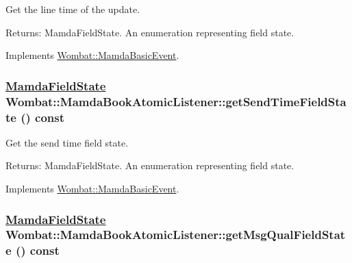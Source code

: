 Get the line time of the update. 

\begin{Desc}
\item[Returns:]Mamda\-Field\-State. An enumeration representing field state. \end{Desc}


Implements \hyperlink{classWombat_1_1MamdaBasicEvent_eb06352aca3280c5e89bad7a3b185cdf}{Wombat::Mamda\-Basic\-Event}.\hypertarget{classWombat_1_1MamdaBookAtomicListener_158632d4f501353404c44410f71555c4}{
\subsubsection[getSendTimeFieldState]{\setlength{\rightskip}{0pt plus 5cm}\hyperlink{namespaceWombat_93aac974f2ab713554fd12a1fa3b7d2a}{Mamda\-Field\-State} Wombat::Mamda\-Book\-Atomic\-Listener::get\-Send\-Time\-Field\-State () const}}
\label{classWombat_1_1MamdaBookAtomicListener_158632d4f501353404c44410f71555c4}


Get the send time field state. 

\begin{Desc}
\item[Returns:]Mamda\-Field\-State. An enumeration representing field state. \end{Desc}


Implements \hyperlink{classWombat_1_1MamdaBasicEvent_418ecb29b412cd42581b54c87b5360fd}{Wombat::Mamda\-Basic\-Event}.\hypertarget{classWombat_1_1MamdaBookAtomicListener_fb7817c15ad089fe8840f16acf6a89d6}{
\subsubsection[getMsgQualFieldState]{\setlength{\rightskip}{0pt plus 5cm}\hyperlink{namespaceWombat_93aac974f2ab713554fd12a1fa3b7d2a}{Mamda\-Field\-State} Wombat::Mamda\-Book\-Atomic\-Listener::get\-Msg\-Qual\-Field\-State () const}}
\label{classWombat_1_1MamdaBookAtomicListener_fb7817c15ad089fe8840f16acf6a89d6}


